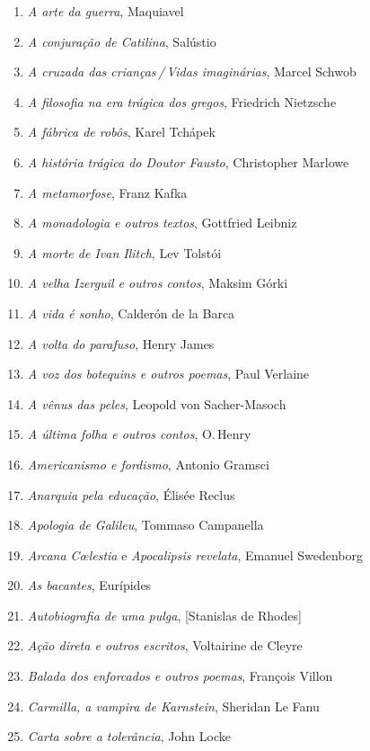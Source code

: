\begin{enumerate}
\setlength\parskip{4.2pt}
\setlength\itemsep{-1.4mm}
\item \textit{A arte da guerra}, Maquiavel
\item \textit{A conjuração de Catilina}, Salústio
\item \textit{A cruzada das crianças\,/\,Vidas imaginárias}, Marcel Schwob
\item \textit{A filosofia na era trágica dos gregos}, Friedrich Nietzsche
\item \textit{A fábrica de robôs}, Karel Tchápek 
\item \textit{A história trágica do Doutor Fausto}, Christopher Marlowe
\item \textit{A metamorfose}, Franz Kafka
\item \textit{A monadologia e outros textos}, Gottfried Leibniz
\item \textit{A morte de Ivan Ilitch}, Lev Tolstói 
\item \textit{A velha Izerguil e outros contos}, Maksim Górki
\item \textit{A vida é sonho}, Calderón de la Barca
\item \textit{A volta do parafuso}, Henry James
\item \textit{A voz dos botequins e outros poemas}, Paul Verlaine 
\item \textit{A vênus das peles}, Leopold von Sacher{}-Masoch
\item \textit{A última folha e outros contos}, O.\,Henry
\item \textit{Americanismo e fordismo}, Antonio Gramsci
\item \textit{Anarquia pela educação}, Élisée Reclus 
\item \textit{Apologia de Galileu}, Tommaso Campanella 
\item \textit{Arcana C\oe lestia} e \textit{Apocalipsis revelata}, Emanuel Swedenborg
\item \textit{As bacantes}, Eurípides
\item \textit{Autobiografia de uma pulga}, [Stanislas de Rhodes]
\item \textit{Ação direta e outros escritos}, Voltairine de Cleyre
\item \textit{Balada dos enforcados e outros poemas}, François Villon
\item \textit{Carmilla, a vampira de Karnstein}, Sheridan Le Fanu
\item \textit{Carta sobre a tolerância}, John Locke

\end{enumerate}
